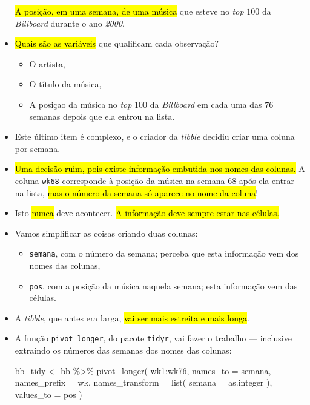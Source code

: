 \documentclass[
  11pt]{report}
\newenvironment{Shaded}{\begin{snugshade}}{\end{snugshade}}
\newcommand{\AttributeTok}[1]{\textcolor[rgb]{0.77,0.63,0.00}{#1}}
\newcommand{\FunctionTok}[1]{\textcolor[rgb]{0.00,0.00,0.00}{#1}}
\newcommand{\NormalTok}[1]{#1}
\newcommand{\OtherTok}[1]{\textcolor[rgb]{0.56,0.35,0.01}{#1}}
\newcommand{\SpecialCharTok}[1]{\textcolor[rgb]{0.00,0.00,0.00}{#1}}
\newcommand{\StringTok}[1]{\textcolor[rgb]{0.31,0.60,0.02}{#1}}
\renewenvironment{Shaded}{
    \begin{mdframed}[%
      roundcorner=2pt,%
      innerleftmargin=5pt,%
      innerrightmargin=5pt,%
      topline=true,%
      leftline=true,%
      rightline=true,%
      bottomline=true,%
      linewidth=0.5pt,%
      linecolor=black!20,%
      backgroundcolor=black!2,%
      skipabove=2ex,%
      skipbelow=2.5ex%
    ]%
  }
  {
    \end{mdframed}
  }
\begin{document}
\begin{itemize}
  {\hl{A posição, em uma semana, de uma música}} que esteve no \emph{top} $100$ da \emph{Billboard} durante o ano \emph{2000}.
\item
  {\hl{Quais são as variáveis}} que qualificam cada observação?

  \begin{itemize}
  \item
    O artista,
  \item
    O título da música,
  \item
    A posiçao da música no \emph{top} $100$ da \emph{Billboard} em cada uma das $76$ semanas depois que ela entrou na lista.
  \end{itemize}
\item
  Este último item é complexo, e o criador da \emph{tibble} decidiu criar uma coluna por semana.
\item
  {\hl{Uma decisão ruim, pois existe informação embutida nos nomes das colunas.}} A coluna \texttt{wk68} corresponde à posição da música na semana $68$ após ela entrar na lista, {\hl{mas o número da semana só aparece no nome da coluna}}!
\item
  Isto {\hl{nunca}} deve acontecer. {\hl{A informação deve sempre estar nas células.}}
\item
  Vamos simplificar as coisas criando duas colunas:

  \begin{itemize}
  \item
    \texttt{semana}, com o número da semana; perceba que esta informação vem dos nomes das colunas,
  \item
    \texttt{pos}, com a posição da música naquela semana; esta informação vem das células.
  \end{itemize}
\item
  A \emph{tibble}, que antes era larga, {\hl{vai ser mais estreita e mais longa}}.
\item
  A função \texttt{pivot\_longer}, do pacote \texttt{tidyr}, vai fazer o trabalho --- inclusive extraindo os números das semanas dos nomes das colunas:

\begin{Shaded}
\begin{Highlighting}[]
\NormalTok{bb\_tidy }\OtherTok{\textless{}{-}}\NormalTok{ bb }\SpecialCharTok{\%\textgreater{}\%} 
  \FunctionTok{pivot\_longer}\NormalTok{(}
\NormalTok{    wk1}\SpecialCharTok{:}\NormalTok{wk76,}
    \AttributeTok{names\_to =} \StringTok{\textquotesingle{}semana\textquotesingle{}}\NormalTok{,}
    \AttributeTok{names\_prefix =} \StringTok{\textquotesingle{}wk\textquotesingle{}}\NormalTok{,}
    \AttributeTok{names\_transform =} \FunctionTok{list}\NormalTok{(}
      \AttributeTok{semana =}\NormalTok{ as.integer}
\NormalTok{    ),}
    \AttributeTok{values\_to =} \StringTok{\textquotesingle{}pos\textquotesingle{}}
\NormalTok{  )}


\end{Highlighting}
\end{Shaded}
\end{itemize}
\end{document}
